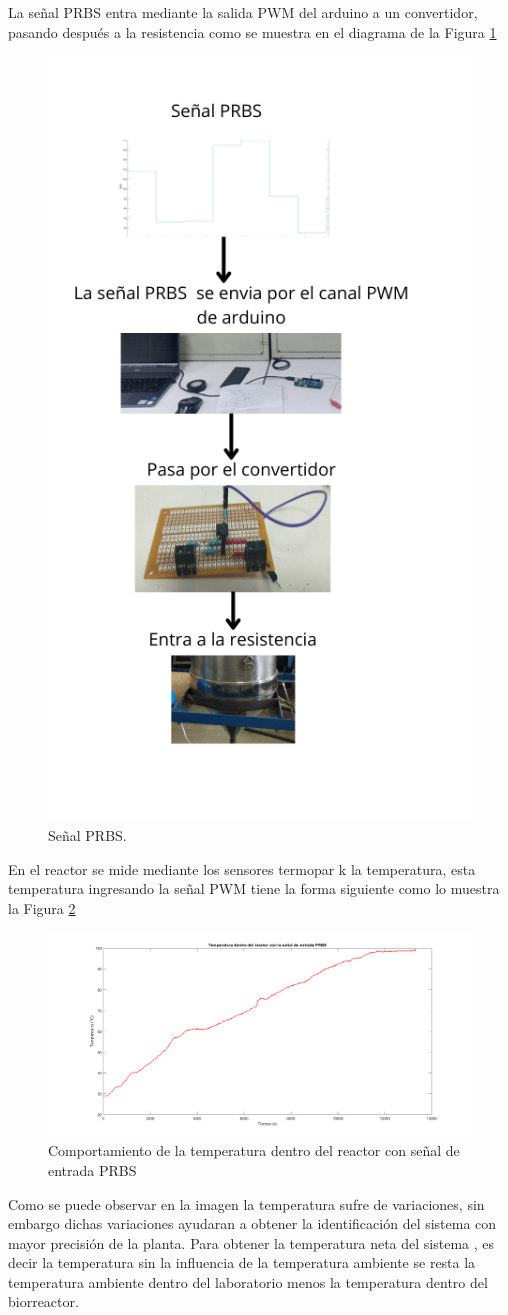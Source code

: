 \documentclass[12pt]{article}
\begin{document}
	
	La señal PRBS entra  mediante la salida PWM del arduino a un convertidor, pasando después a la resistencia como se muestra en el diagrama de la Figura \ref{ diagrama_prbs}
	
	\begin{figure}[h!]
		\centering
		\includegraphics[width=.4\linewidth]{imagenes/diagrama_PRBS}
		\caption{Señal PRBS. }
		\label{ diagrama_prbs}
	\end{figure}
	
	En el reactor se mide mediante los sensores termopar k  la temperatura, esta temperatura ingresando la señal PWM tiene la forma siguiente como lo muestra la Figura \ref{ Temperatura_con PRBS}
	
	\begin{figure}[h!]
		\centering
		\includegraphics[width=.8\linewidth]{imagenes/temperatura con prbs}
		\caption{Comportamiento de la temperatura dentro del reactor con señal de entrada PRBS }
		\label{ Temperatura_con PRBS}
	\end{figure}
	
	
	Como se puede observar en la imagen la temperatura sufre de variaciones,  sin embargo dichas variaciones ayudaran a obtener la identificación del sistema con mayor precisión de la planta.
	Para obtener la temperatura neta del sistema , es decir la temperatura sin la influencia de la temperatura ambiente se resta la temperatura ambiente dentro del laboratorio menos la temperatura dentro del biorreactor.
	
\end{document}
